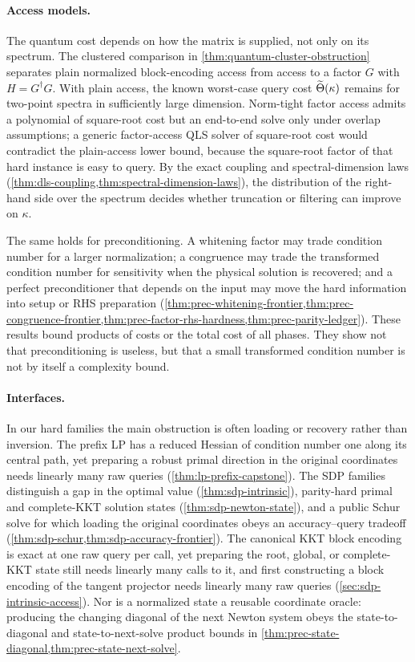 \paragraph{Access models.}
The quantum cost depends on how the matrix is supplied, not only on its
spectrum.  The clustered comparison in \cref{thm:quantum-cluster-obstruction}
separates plain normalized block-encoding access from access to a factor
\(G\) with \(H=G^\dagger G\).  With plain access, the known worst-case query cost
\(\widetilde{\Theta}(\kappa)\) remains for two-point spectra in sufficiently large
dimension.  Norm-tight factor access admits a polynomial of square-root cost
but an end-to-end solve only under overlap assumptions; a generic
factor-access QLS solver of square-root cost would contradict the
plain-access lower bound, because the square-root factor of that hard
instance is easy to query.  By the exact coupling and
spectral-dimension laws
(\cref{thm:dls-coupling,thm:spectral-dimension-laws}), the distribution of the
right-hand side over the spectrum decides whether truncation or filtering
can improve on \(\kappa\).

The same holds for preconditioning.  A whitening factor may trade condition
number for a larger normalization; a congruence may trade the transformed
condition number for sensitivity when the physical solution is recovered; and
a perfect preconditioner that depends on the input may move the hard
information into setup or RHS preparation
(\cref{thm:prec-whitening-frontier,thm:prec-congruence-frontier,thm:prec-factor-rhs-hardness,thm:prec-parity-ledger}).
These results bound products of costs or the total cost of all phases.
They show not that preconditioning is useless, but that a small transformed
condition number is not by itself a complexity bound.

\paragraph{Interfaces.}
In our hard families the main obstruction is often loading or recovery
rather than inversion.  The prefix LP has a reduced Hessian of condition
number one along its central path, yet preparing a robust primal direction
in the original coordinates needs linearly many raw queries
(\cref{thm:lp-prefix-capstone}).  The SDP families distinguish a gap in the
optimal value (\cref{thm:sdp-intrinsic}), parity-hard primal and
complete-KKT solution states (\cref{thm:sdp-newton-state}), and a public Schur
solve for which loading the original coordinates obeys an accuracy--query
tradeoff (\cref{thm:sdp-schur,thm:sdp-accuracy-frontier}).  The canonical KKT
block encoding is exact at one raw query per call, yet preparing the root,
global, or complete-KKT state still needs linearly many calls to it, and
first constructing a block encoding of the tangent projector needs linearly
many raw queries (\cref{sec:sdp-intrinsic-access}).  Nor is a normalized state a
reusable coordinate oracle: producing the changing diagonal of the next Newton system
obeys the state-to-diagonal and state-to-next-solve product bounds in
\cref{thm:prec-state-diagonal,thm:prec-state-next-solve}.

